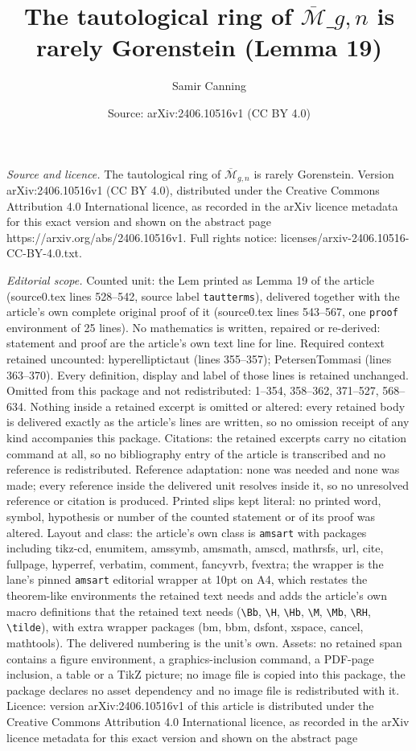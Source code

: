 \documentclass[10pt,a4paper]{amsart}
\title[The tautological ring of $\overline{\mathcal{M}}\_{g,n}$ is r]{The tautological ring of $\overline{\mathcal{M}}\_{g,n}$ is rarely Gorenstein (Lemma 19)}
\author{Samir Canning}
\date{Source: arXiv:2406.10516v1 (CC BY 4.0)}
\begin{document}
\maketitle

\noindent\emph{Source and licence.} The tautological ring of $\overline{\mathcal{M}}_{g,n}$ is rarely Gorenstein. Version arXiv:2406.10516v1 (CC BY 4.0), distributed under the Creative Commons Attribution 4.0 International licence, as recorded in the arXiv licence metadata for this exact version and shown on the abstract page https://arxiv.org/abs/2406.10516v1. Full rights notice: licenses/arxiv-2406.10516-CC-BY-4.0.txt.\par\smallskip

\noindent\textit{Editorial scope.} Counted unit: the Lem printed as Lemma 19 of the article (source0.tex lines 528--542, source label \texttt{tautterms}), delivered together with the article's own complete original proof of it (source0.tex lines 543--567, one \texttt{proof} environment of 25 lines). No mathematics is written, repaired or re-derived: statement and proof are the article's own text line for line. Required context retained uncounted: hyperelliptictaut (lines 355--357); PetersenTommasi (lines 363--370). Every definition, display and label of those lines is retained unchanged. Omitted from this package and not redistributed: 1--354, 358--362, 371--527, 568--634. Nothing inside a retained excerpt is omitted or altered: every retained body is delivered exactly as the article's lines are written, so no omission receipt of any kind accompanies this package. Citations: the retained excerpts carry no citation command at all, so no bibliography entry of the article is transcribed and no reference is redistributed. Reference adaptation: none was needed and none was made; every reference inside the delivered unit resolves inside it, so no unresolved reference or citation is produced. Printed slips kept literal: no printed word, symbol, hypothesis or number of the counted statement or of its proof was altered. Layout and class: the article's own class is \texttt{amsart} with packages including tikz-cd, enumitem, amssymb, amsmath, amscd, mathrsfs, url, cite, fullpage, hyperref, verbatim, comment, fancyvrb, fvextra; the wrapper is the lane's pinned \texttt{amsart} editorial wrapper at 10pt on A4, which restates the theorem-like environments the retained text needs and adds the article's own macro definitions that the retained text needs (\texttt{\textbackslash Bb}, \texttt{\textbackslash H}, \texttt{\textbackslash Hb}, \texttt{\textbackslash M}, \texttt{\textbackslash Mb}, \texttt{\textbackslash RH}, \texttt{\textbackslash tilde}), with extra wrapper packages (bm, bbm, dsfont, xspace, cancel, mathtools). The delivered numbering is the unit's own. Assets: no retained span contains a figure environment, a graphics-inclusion command, a PDF-page inclusion, a table or a TikZ picture; no image file is copied into this package, the package declares no asset dependency and no image file is redistributed with it. Licence: version arXiv:2406.10516v1 of this article is distributed under the Creative Commons Attribution 4.0 International licence, as recorded in the arXiv licence metadata for this exact version and shown on the abstract page 
\end{document}
